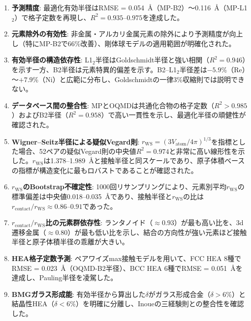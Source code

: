 \documentclass[a4paper,10pt,5p]{elsarticle}
\begin{document}
\begin{enumerate}
\setlength{\parskip}{0cm}
\setlength{\itemsep}{0.1cm}
    \item \textbf{予測精度}: 最適化有効半径はRMSE = 0.054~\AA（MP-B2）～0.116~\AA（MP-L1$_2$）で格子定数を再現し、$R^2 = 0.935$--$0.975$を達成した。

    \item \textbf{元素除外の有効性}: 非金属・アルカリ金属元素の除外により予測精度が向上し（特にMP-B2で66\%改善）、剛体球モデルの適用範囲が明確化された。

    \item \textbf{有効半径の構造依存性}: L1$_2$半径はGoldschmidt半径と強い相関（$R^2 = 0.946$）を示す一方、B2半径は元素特異的偏差を示す。B2--L1$_2$半径差は$-5.9$\%（Re）～$+7.9$\%（Ni）と広範に分布し、Goldschmidtの一律3\%収縮則では説明できない。

    \item \textbf{データベース間の整合性}: MPとOQMDは共通化合物の格子定数（$R^2 > 0.985$）およびB2半径（$R^2 = 0.958$）で高い一貫性を示し、最適化半径の頑健性が確認された。

    \item \textbf{Wigner--Seitz半径による疑似Vegard則}: $r_\mathrm{WS} = (3V_\mathrm{atom}/4\pi)^{1/3}$を指標とした場合、52ペアの疑似Vegard則の中央値$R^2 = 0.974$と非常に高い線形性を示した。$r_\mathrm{WS}$は1.378--1.989~\AA と接触半径と同スケールであり、原子体積ベースの指標が構造変化に最もロバストであることが確認された。

    \item \textbf{$r_\mathrm{WS}$のBootstrap不確定性}: 1000回リサンプリングにより、元素別平均$r_\mathrm{WS}$の標準偏差は中央値0.018--0.035~\AA であり、接触半径と$r_\mathrm{WS}$の比は$r_\mathrm{contact}/r_\mathrm{WS} \approx 0.86$--$0.91$であった。

    \item \textbf{$r_\mathrm{contact}/r_\mathrm{WS}$比の元素群依存性}: ランタノイド（$\approx 0.93$）が最も高い比を、3d遷移金属（$\approx 0.80$）が最も低い比を示し、結合の方向性が強い元素ほど接触半径と原子体積半径の乖離が大きい。

    \item \textbf{HEA格子定数予測}: ペアワイズmax接触モデルを用いて、FCC HEA 8種でRMSE = 0.023~\AA（OQMD-B2半径）、BCC HEA 6種でRMSE = 0.051~\AA を達成し、Pauling半径を凌駕した。

    \item \textbf{BMGガラス形成能}: 有効半径から算出した$\delta$がガラス形成合金（$\delta > 6$\%）と結晶性HEA（$\delta < 6$\%）を明確に分離し、Inoueの三経験則との整合性を確認した。
\end{enumerate}
\end{document}
